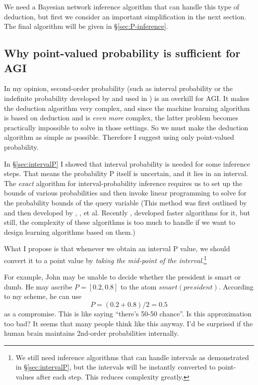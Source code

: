 We need a Bayesian network inference algorithm that can handle this type of deduction, but first we consider an important simplification in the next section.  The final algorithm will be given in \S\ref{sec:P-inference}.

\subsection{Why point-valued probability is sufficient for AGI}
\label{sec:PointValued}

In my opinion, second-order probability (such as interval probability or the indefinite probability developed by \citep*{Walley1991} and used in \citep*{Goertzel2008}) is an overkill for AGI.  It makes the deduction algorithm very complex, and since the machine learning algorithm is based on deduction and is \textit{even more} complex, the latter problem becomes practically impossible to solve in those settings.  So we must make the deduction algorithm as simple as possible.  Therefore I suggest using only point-valued probability.

In \S\ref{sec:intervalP} I showed that interval probability is needed for some inference steps.  That means the probability P itself is uncertain, and it lies in an interval.  The \emph{exact} algorithm for interval-probability inference requires us to set up the bounds of various probabilities and then invoke linear programming to solve for the probability bounds of the query variable (This method was first outlined by \citep*{Boole1854} and then developed by \citep*{Hailperin1965}, \citep*{Nilsson1986}, \citep*{Ng1992} et al. Recently \citep*{Hansen2000}, \citep*{Jaumard2006} developed faster algorithms for it, but still, the complexity of these algorithms is too much to handle if we want to design learning algorithms based on them.)

What I propose is that whenever we obtain an interval P value, we should convert it to a point value by \emph{taking the mid-point of the interval}.\footnote{We still need inference algorithms that can handle intervals as demonstrated in \S\ref{sec:intervalP}, but the intervals will be instantly converted to point-values after each step. This reduces complexity greatly.}

For example, John may be unable to decide whether the president is smart or dumb.  He may ascribe $P = [0.2,0.8]$ to the atom $smart(president)$.  According to my scheme, he can use \[ P = (0.2 + 0.8) / 2 = 0.5 \] as a compromise.  This is like saying ``there's 50-50 chance''.  Is this approximation too bad?  It seems that many people think like this anyway.  I'd be surprised if the human brain maintains 2nd-order probabilities internally.

